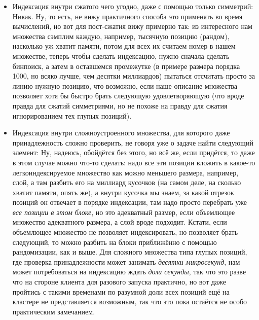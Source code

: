 \documentclass[12pt]{article}
\begin{document}
\begin{itemize}
  \item Индексация внутри сжатого чего угодно, даже с помощью только симметрий: Никак. Ну, то есть, не вижу практичного способа это применять во время вычислений, но вот для пост-сжатия вижу примерно так: из интересного нам множества сэмплим каждую, например, тысячную позицию (рандом), насколько уж хватит памяти, потом для всех их считаем номер в нашем множестве, теперь чтобы сделать индексацию, нужно сначала сделать бинпоиск, а затем в оставшемся промежутке (в примере размера порядка 1000, но всяко лучше, чем десятки миллиардов) пытаться отсчитать просто за линию нужную позицию, что возможно, если наше описание множества позволяет хотя бы быстро брать следующую удовлетворяющую (что вроде правда для сжатий симметриями, но не похоже на правду для сжатия игнорированием тех глупых позиций).\\
  \item Индексация внутри сложноустроенного множества, для которого даже принадлежность сложно проверить, не говоря уже о задаче найти следующий элемент: Ну, надеюсь, обойдётся без этого, но всё же, если придётся, то даже в этом случае можно что-то сделать: надо все эти позиции вложить в какое-то легкоиндексируемое множество как можно меньшего размера, например, слой, а там разбить его на миллиард кусочков (на самом деле, на сколько хватит памяти, опять же), а внутри кусочка мы знаем, за какой отрезок позиций он отвечает в порядке индексации, там надо просто перебрать уже \textit{все позиции в этом блоке}, но это адекватный размер, если объемлющее множество адекватного размера, а слой вроде подходит. Кстати, если объемлющее множество не позволяет индексировать, но позволяет брать следующий, то можно разбить на блоки приближённо с помощью рандомизации, как и выше. Для сложного множества типа глупых позиций, где проверка принадлежности может занимать \textit{десятки микросекунд}, нам может потребоваться на индексацию ждать \textit{доли секунды}, так что это разве что на стороне клиента для разового запуска практично, но вот даже пройтись с такими временами по разумной доли всех позиций ещё на кластере не представляется возможным, так что это пока остаётся не особо практическим замечанием.\\
\end{itemize}
\end{document}
